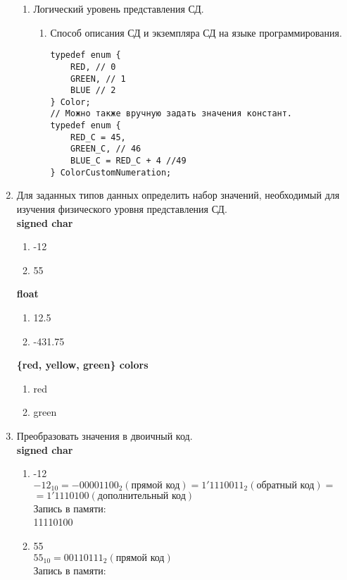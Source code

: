 \documentclass[a4paper,14pt]{extarticle}
\begin{document}
\begin{enumerate}
\begin{enumerate}[label*=\arabic*.]
		      \item Логический уровень представления СД.
		            \begin{enumerate}[label*=\arabic*.]
			            \item Способ описания СД и экземпляра СД на языке программирования.
			                  \begin{verbatim}
typedef enum {
    RED, // 0
    GREEN, // 1
    BLUE // 2
} Color;
// Можно также вручную задать значения констант.
typedef enum {
    RED_C = 45, 
    GREEN_C, // 46
    BLUE_C = RED_C + 4 //49
} ColorCustomNumeration;
					  \end{verbatim}
		            \end{enumerate}
	      \end{enumerate}
	\item Для заданных типов данных определить набор значений, необходимый
	      для изучения физического уровня представления СД.\\
	      \textbf{signed char}
		  \begin{enumerate}[1. ]
			\item -12
			\item 55
		  \end{enumerate}
	      \textbf{float}
		  \begin{enumerate}[1. ]
			\item 12.5
			\item -431.75
		  \end{enumerate}
	      \textbf{\{red, yellow, green\} colors}
		  \begin{enumerate}[1. ]
			\item red
			\item green
		  \end{enumerate}
\item Преобразовать значения в двоичный код.\\
\textbf{signed char}
\begin{enumerate}[1. ]
  \item -12\\
  $-12_{10} = -00001100_2 (\textit{прямой код}) = 1'1110011_2 (\textit{обратный код}) = $\\$ = 1'1110100 (\textit{дополнительный код})$\\
  Запись в памяти:\\
  11110100
  \item 55\\
  $55_{10} = 00110111_2 (\textit{прямой код})$\\
  Запись в памяти:\\

\end{enumerate}
\end{enumerate}
\end{document}
